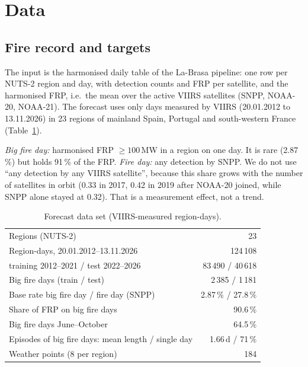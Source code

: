 \documentclass[conference,a4paper]{IEEEtran}
\begin{document}
\section{Data}

\subsection{Fire record and targets}
The input is the harmonised daily table of the La-Brasa pipeline: one row per NUTS-2 region and day, with detection
counts and FRP per satellite, and the harmonised FRP, i.e.\ the mean over the active VIIRS satellites (SNPP, NOAA-20,
NOAA-21). The forecast uses only days measured by VIIRS (20.01.2012 to 13.11.2026) in 23 regions of mainland Spain,
Portugal and south-western France (Table~\ref{tab:data}).

\emph{Big fire day:} harmonised FRP $\geq 100$\,MW in a region on one day. It is rare (2.87\,\%) but holds 91\,\% of the
FRP. \emph{Fire day:} any detection by SNPP. We do not use ``any detection by any VIIRS satellite'', because this share
grows with the number of satellites in orbit (0.33 in 2017, 0.42 in 2019 after NOAA-20 joined, while SNPP alone stayed
at 0.32). That is a measurement effect, not a trend.

\begin{table}[t]
\centering
\caption{Forecast data set (VIIRS-measured region-days).}
\label{tab:data}
\footnotesize
\begin{tabular}{@{}lr@{}}
\toprule
Regions (NUTS-2) & 23 \\
Region-days, 20.01.2012--13.11.2026 & 124\,108 \\
\quad training 2012--2021 / test 2022--2026 & 83\,490 / 40\,618 \\
Big fire days (train / test) & 2\,385 / 1\,181 \\
Base rate big fire day / fire day (SNPP) & 2.87\,\% / 27.8\,\% \\
Share of FRP on big fire days & 90.6\,\% \\
Big fire days June--October & 64.5\,\% \\
Episodes of big fire days: mean length / single day & 1.66\,d / 71\,\% \\
Weather points (8 per region) & 184 \\
\bottomrule
\end{tabular}
\end{table}
\end{document}
